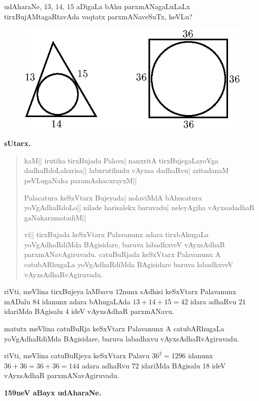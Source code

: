 udAharaNe, $13$, $14$, $15$ aDigaLa bAhu parxmANagaLuLaLx
tirxBujAMtagaRtavAda vaqtatx parxmANaveSuTx, heVLu?
\begin{figure}[H]
\centering
\includegraphics{figure/fig34.eps}
\end{figure}

\begin{center}
{\large\bf sUtarx.}
\end{center}

\begin{verse}
kaM|| irutiha tirxBujada Palava| nanxritA tirxBujegaLayoVga
dadhaRdoLahxrisa|| labxrutihudu vAyxsa \hbox{dadhaRvu|} aritadanaM
peVLugaNaka paramAshacxrayxM||

Palacatura keSxVtarx Bujeyada| nolaviMdA bAhucatura yoVgAdhaRdoLo||
nilade harisalekx baruvadu| neleyAgiha vAyxsadadhaR gaNakaramatadiM||

vi|| tirxBujada keSxVtarx Palavanunx adara tirxbAhugaLa yoVgAdhaRdiMda
BAgisidare, baruva labadhxveV vAyxsAdhaR
parxmANavAgiruvadu. catuBuRjada keSxVtarx Palavanunx A catubARhugaLa
yoVgAdhaR\-diMda BAgisidare baruva labadhxveV vAyxsAdhaRvAgiruvadu. 
\end{verse}

riVti, meVlina tirxBujeya laMbavu $12$nunx sAdhisi keSxVtarx
Palavanunx mADalu $84$ idanunx adara bAhugaLAda $13+14+15=42$ idara
adhaRvu $21$ idariMda BAgisalu $4$ ideV vAyxsAdhaR parxmANavu.

matutx meVlina catuBuRja keSxVtarx Palavanunx A catubARhugaLa
yoVgAdhaRdiMda BAgisidare, baruva labadhxvu vAyxsAdhaRvAgiruvadu.

riVti, meVlina catuBuRjeya keSxVtarx Palavu $36^{2}=1296$ idanunx
$36+36=36+36=144$ adara adhaRvu $72$ idariMda BAgisalu $18$ ideV
vAyxsAdhaR parxmANavAgiruvadu.

\medskip
\begin{center}
{\large\bf 159neV aBayx udAharaNe.}
\end{center}

